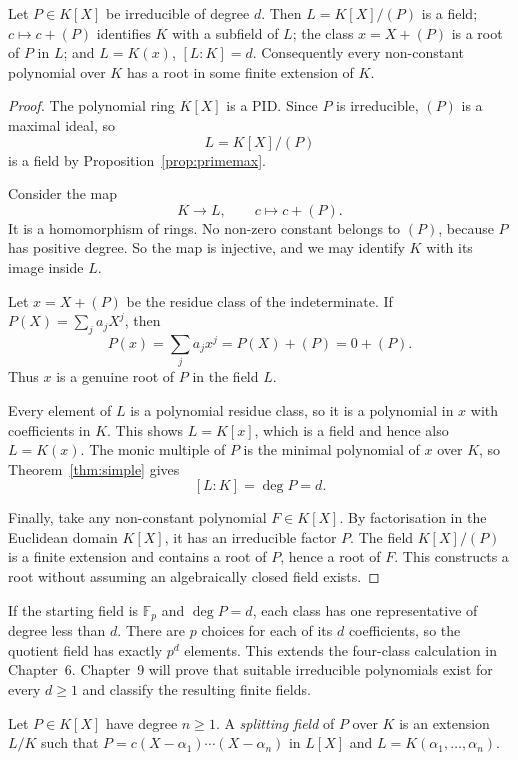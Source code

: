 \begin{theorem}[Kronecker]\label{thm:kronecker}
Let $P\in K[X]$ be irreducible of degree $d$. Then $L=K[X]/(P)$ is a field; $c\mapsto c+(P)$ identifies $K$ with a subfield of $L$; the class $x=X+(P)$ is a root of $P$ in $L$; and $L=K(x)$, $[L:K]=d$. Consequently every non-constant polynomial over $K$ has a root in some finite extension of $K$.
\end{theorem}
\begin{proof}
The polynomial ring $K[X]$ is a PID.
Since $P$ is irreducible, $(P)$
is a maximal ideal, so
\[
L=K[X]/(P)
\]
is a field by Proposition~\ref{prop:primemax}.

Consider the map
\[
K\longrightarrow L,\qquad
c\longmapsto c+(P).
\]
It is a homomorphism of rings.
No non-zero constant belongs to
$(P)$, because $P$ has positive
degree. So the map is injective,
and we may identify $K$ with its
image inside $L$.

Let $x=X+(P)$ be the residue class
of the indeterminate. If
$P(X)=\sum_j a_jX^j$, then
\[
P(x)=\sum_j a_jx^j
=P(X)+(P)=0+(P).
\]
Thus $x$ is a genuine root of $P$
in the field $L$.

Every element of $L$ is a polynomial
residue class, so it is a polynomial
in $x$ with coefficients in $K$.
This shows $L=K[x]$, which is a field
and hence also $L=K(x)$.
The monic multiple of $P$ is the
minimal polynomial of $x$ over $K$,
so Theorem~\ref{thm:simple} gives
\[
[L:K]=\deg P=d.
\]

Finally, take any non-constant
polynomial $F\in K[X]$. By
factorisation in the Euclidean
domain $K[X]$, it has an
irreducible factor $P$. The field
$K[X]/(P)$ is a finite extension
and contains a root of $P$,
hence a root of $F$.
This constructs a root without
assuming an algebraically closed
field exists.
\end{proof}

If the starting field is $\mathbb F_p$ and $\deg P=d$, each class has
one representative of degree less than $d$. There are $p$ choices for
each of its $d$ coefficients, so the quotient field has exactly $p^d$
elements. This extends the four-class calculation in Chapter~6.
Chapter~9 will prove that suitable irreducible polynomials exist for
every $d\ge1$ and classify the resulting finite fields.

\begin{definition}
Let $P\in K[X]$ have degree $n\ge1$. A \emph{splitting field} of $P$ over $K$ is an extension $L/K$ such that $P=c(X-\alpha_1)\cdots(X-\alpha_n)$ in $L[X]$ and $L=K(\alpha_1,\dots,\alpha_n)$.
\end{definition}

